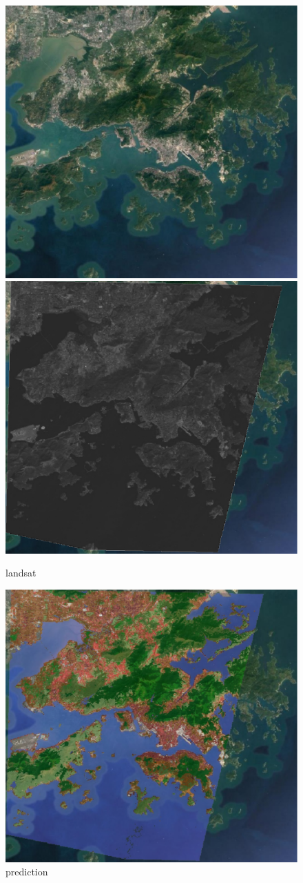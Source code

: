 \documentclass[
]{article}
\begin{document}
\begin{figure}[H]

{\centering \includegraphics[width=0.45\linewidth]{../results/map_images/google_satellite} \includegraphics[width=0.45\linewidth]{../results/map_images/one_landsat_scene} 

}

\caption{landsat}\label{fig:maps1}
\end{figure}

\begin{figure}[H]

{\centering \includegraphics[width=0.5\linewidth]{../results/map_images/lcz_prediction} 

}

\caption{prediction}\label{fig:maps2}
\end{figure}
\end{document}
